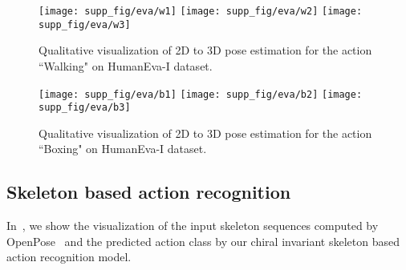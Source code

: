 \documentclass{article}
\begin{document}
\begin{figure}[t]
\centering
\texttt{[image: supp\_fig/eva/w1]}
\texttt{[image: supp\_fig/eva/w2]}
\texttt{[image: supp\_fig/eva/w3]}
\caption{Qualitative visualization of 2D to 3D pose estimation for the action ``Walking" on HumanEva-I dataset.}
\label{fig:supp_eva_walk}
\end{figure}
\begin{figure}[t]
\centering
\texttt{[image: supp\_fig/eva/b1]}
\texttt{[image: supp\_fig/eva/b2]}
\texttt{[image: supp\_fig/eva/b3]}
\caption{Qualitative visualization of 2D to 3D pose estimation for the action ``Boxing" on HumanEva-I dataset.}
\label{fig:supp_eva_box}
\end{figure}


\subsection{Skeleton based action recognition}
In~, we show the visualization of the input skeleton sequences computed by OpenPose~\cite{cao2018openpose} and the predicted action class by our chiral invariant skeleton based action recognition model.
\end{document}
